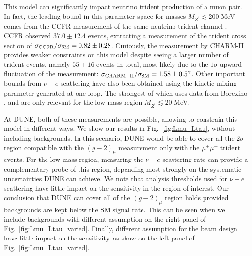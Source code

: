 This model can significantly impact neutrino trident production of a muon pair. In fact, the leading bound in this parameter space for masses $M_{Z^\prime} \lesssim 200$ MeV comes from the CCFR measurement of the same neutrino trident channel \cite{Mishra:1991bv}. CCFR observed $37.0\pm 12.4$ events, extracting a measurement of the trident cross section of $\sigma_{\rm CCFR}/\sigma_{\rm SM} = 0.82 \pm 0.28$. Curiously, the measurement by CHARM-II \cite{Geiregat:1990gz} provides weaker constraints on this model despite seeing a larger number of trident events, namely $55 \pm 16$ events in total, most likely due to the $1\sigma$ upward fluctuation of the measurement: $\sigma_{\rm CHARM-II}/\sigma_{\rm SM} = 1.58 \pm 0.57$. Other important bounds from $\nu-e$ scattering have also been obtained using the kinetic mixing parameter generated at one-loop. The strongest of which uses data from Borexino \cite{Kaneta:2016uyt}, and are only relevant for the low mass region $M_{Z^\prime} \lesssim 20$ MeV.

At DUNE, both of these measurements are possible, allowing to constrain this model in different ways. We show our results in Fig.~\ref{fig:Lmu_Ltau}, without including backgrounds. In this scenario, DUNE would be able to cover all the $2 \sigma$ region compatible with the $(g-2)_\mu$ measurement only with the $\mu^+ \mu^-$ trident events. For the low mass region, measuring the $\nu-e$ scattering rate can provide a complementary probe of this region, depending most strongly on the systematic uncertainties DUNE can achieve. We note that analysis thresholds used for $\nu-e$ scattering have little impact on the sensitivity in the region of interest. Our conclusion that DUNE can cover all of the $(g-2)_\mu$ region holds provided backgrounds are kept below the SM signal rate. This can be seen when we include backgrounds with different assumption on the right panel of Fig.~\ref{fig:Lmu_Ltau_varied}. Finally, different assumption for the beam design have little impact on the sensitivity, as show on the left panel of Fig.~\ref{fig:Lmu_Ltau_varied}.

